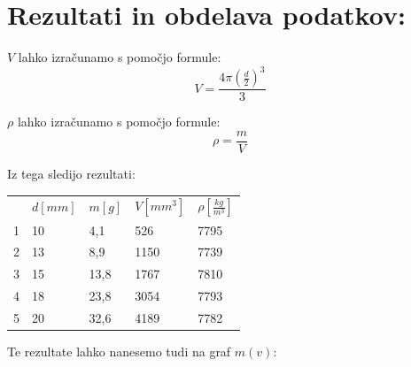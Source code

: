 \documentclass[a4paper]{article}
\begin{document}
\section*{Rezultati in obdelava podatkov:}

\begin{multicols}{2}
$V$ lahko izračunamo s pomočjo formule:
\begin{equation}
   V = \frac{4\pi (\frac{d}{2})^3}{3}
\end{equation}

\columnbreak

$\rho$ lahko izračunamo s pomočjo formule:
\begin{equation}
   \rho = \frac{m}{V}
\end{equation}

\end{multicols}

Iz tega sledijo rezultati:
\begin{table}[H]
   \centering
\begin{tabular}{lllll}
   & $d[mm]$ & $m[g]$ & $V[mm^3]$ & $\rho[\frac{kg}{m^3}]$  \\
1 & 10     & 4,1  & 526         & 7795    \\
2 & 13     & 8,9  & 1150        & 7739    \\
3 & 15     & 13,8 & 1767        & 7810    \\
4 & 18     & 23,8 & 3054        & 7793    \\
5 & 20     & 32,6 & 4189        & 7782
\end{tabular}
\end{table}

Te rezultate lahko nanesemo tudi na graf $m(v)$:
\datatable

\begin{center}
\end{center}
\end{document}
